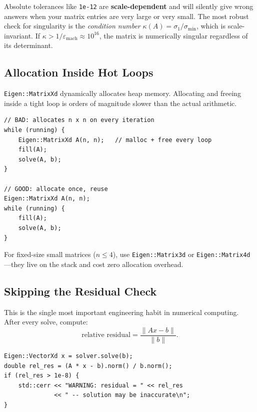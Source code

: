 \begin{tipbox}
Absolute tolerances like \texttt{1e-12} are \textbf{scale-dependent}
and will silently give wrong answers when your matrix entries are
very large or very small.  The most robust check for singularity is the
\emph{condition number} $\kappa(A) = \sigma_1 / \sigma_{\min}$,
which is scale-invariant.
If $\kappa > 1/\varepsilon_{\mathrm{mach}} \approx 10^{16}$,
the matrix is numerically singular regardless of its determinant.
\end{tipbox}

\subsection{Allocation Inside Hot Loops}

\texttt{Eigen::MatrixXd} dynamically allocates heap memory.
Allocating and freeing inside a tight loop is orders of magnitude
slower than the actual arithmetic.

\begin{lstlisting}
// BAD: allocates n x n on every iteration
while (running) {
    Eigen::MatrixXd A(n, n);   // malloc + free every loop
    fill(A);
    solve(A, b);
}

// GOOD: allocate once, reuse
Eigen::MatrixXd A(n, n);
while (running) {
    fill(A);
    solve(A, b);
}
\end{lstlisting}

For fixed-size small matrices ($n \le 4$), use \texttt{Eigen::Matrix3d}
or \texttt{Eigen::Matrix4d}---they live on the stack and cost zero
allocation overhead.

\subsection{Skipping the Residual Check}

This is the single most important engineering habit in numerical
computing.  After every solve, compute:
\[
    \text{relative residual} = \frac{\|Ax - b\|}{\|b\|}.
\]

\begin{lstlisting}
Eigen::VectorXd x = solver.solve(b);
double rel_res = (A * x - b).norm() / b.norm();
if (rel_res > 1e-8) {
    std::cerr << "WARNING: residual = " << rel_res
              << " -- solution may be inaccurate\n";
}
\end{lstlisting}

